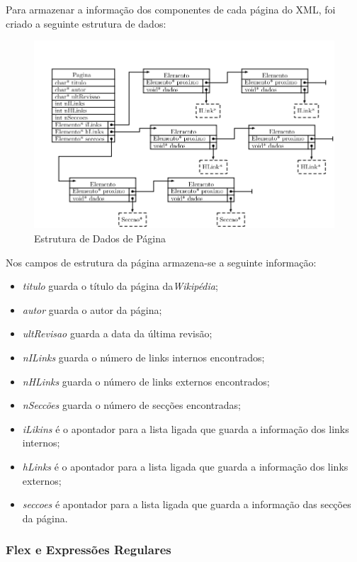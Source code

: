 \documentclass[11pt, a4paper, oneside]{article}
\begin{document}
Para armazenar a informação dos componentes de cada página do XML, foi criado a seguinte estrutura de dados: \\
\begin{figure}[h]
\begin{center}
\includegraphics[width=0.9\linewidth]{pagina}
\caption{Estrutura de Dados de Página}
\end{center}
\end{figure}

Nos campos de estrutura da página armazena-se a seguinte informação:
\begin{itemize}

\item \textit{titulo} guarda o título da página da\textit{Wikipédia};
\item \textit{autor} guarda o autor da página;
\item \textit{ultRevisao} guarda a data da última revisão;
\item \textit{nILinks} guarda o número de links internos encontrados;
\item \textit{nHLinks} guarda o número de links externos encontrados;
\item \textit{nSeccões} guarda o número de secções encontradas;
\item \textit{iLikins} é o apontador para a lista ligada que guarda a informação dos links internos;
\item \textit{hLinks} é o apontador para a lista ligada que guarda a informação dos links externos;
\item \textit{seccoes} é apontador para a lista ligada que guarda a informação das secções da página.
\end{itemize}


\newpage
\subsubsection{Flex e Expressões Regulares}
\end{document}
